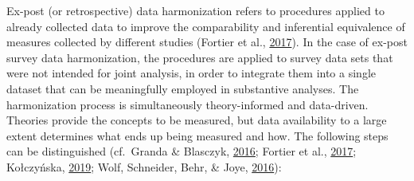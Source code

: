 \documentclass[12pt,]{article}
\begin{document}
Ex-post (or retrospective) data harmonization refers to procedures applied to already collected data to improve the comparability and inferential equivalence of measures collected by different studies (Fortier et al., \protect\hyperlink{ref-Fortier2017a}{2017}). In the case of ex-post survey data harmonization, the procedures are applied to survey data sets that were not intended for joint analysis, in order to integrate them into a single dataset that can be meaningfully employed in substantive analyses. The harmonization process is simultaneously theory-informed and data-driven. Theories provide the concepts to be measured, but data availability to a large extent determines what ends up being measured and how. The following steps can be distinguished (cf.~Granda \& Blasczyk, \protect\hyperlink{ref-Granda2016}{2016}; Fortier et al., \protect\hyperlink{ref-Fortier2017a}{2017}; Kołczyńska, \protect\hyperlink{ref-Kolczynska2019}{2019}; Wolf, Schneider, Behr, \& Joye, \protect\hyperlink{ref-Wolf2016}{2016}):
\end{document}
